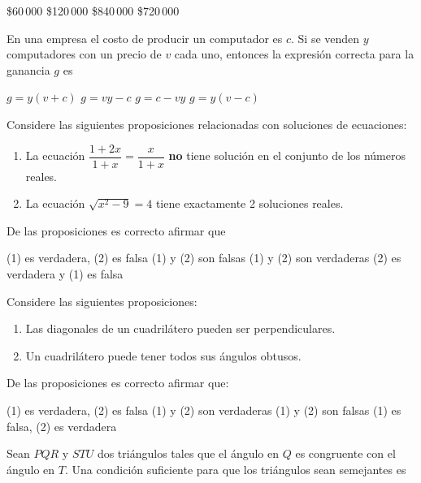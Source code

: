 \documentclass[10pt,addpoints]{exam}
\begin{document}
\begin{questions}
\begin{oneparchoices}
  \choice \$60\,000
  \choice \$120\,000
  \CorrectChoice \$840\,000
  \choice \$720\,000
\end{oneparchoices}
\question En una empresa el costo de producir un computador es $c$. Si se venden $y$ computadores con un precio de $v$ cada uno, entonces la expresión correcta para la ganancia $g$ es
 \begin{choices}
  \begin{multicols}{2}
   \choice $g=y(v+c)$
   \choice $g=vy-c$
   \choice $g=c-vy$
   \CorrectChoice $g=y(v-c)$
  \end{multicols}
 \end{choices}
\question Considere las siguientes proposiciones relacionadas con soluciones de ecuaciones:
\begin{enumerate}
 \item[(1)] La ecuación $\dfrac{1+2x}{1+x}=\dfrac{x}{1+x}$ \textbf{no} tiene solución en el conjunto de los números reales.
 \item[(2)] La ecuación $\sqrt{x^{2}-9}=4$ tiene exactamente 2 soluciones reales. 
\end{enumerate}
De las proposiciones es correcto afirmar que
\begin{choices}
 \begin{multicols}{2}
  \choice (1) es verdadera, (2) es falsa
  \choice (1) y (2) son falsas
  \choice (1) y (2) son verdaderas
  \CorrectChoice (2) es verdadera y (1) es falsa
 \end{multicols}
\end{choices}
\question Considere las siguientes proposiciones:
\begin{enumerate}
 \item[(1)] Las diagonales de un cuadrilátero pueden ser perpendiculares.
 \item[(2)] Un cuadrilátero puede tener todos sus ángulos obtusos. 
\end{enumerate}
De las proposiciones es correcto afirmar que:
\begin{choices}
 \begin{multicols}{2}
  \CorrectChoice (1) es verdadera, (2) es falsa
  \choice (1) y (2) son verdaderas
  \choice (1) y (2) son falsas
  \choice (1) es falsa, (2) es verdadera
 \end{multicols}
\end{choices}
\question Sean $PQR$ y $STU$ dos triángulos tales que el ángulo en $Q$ es congruente con el ángulo en $T$. Una condición suficiente para que los triángulos sean semejantes es


\end{questions}
\end{document}
